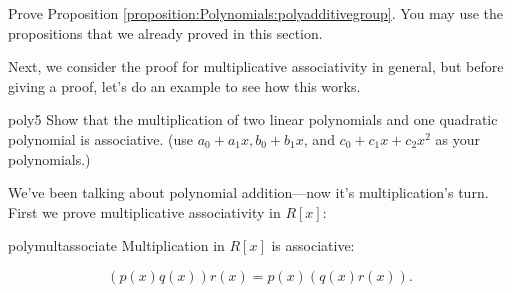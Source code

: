 \begin{exercise}{}
Prove Proposition \ref{proposition:Polynomials:polyadditivegroup}. You may use the propositions that we already proved in this section.
\end{exercise}

Next, we consider the proof for multiplicative associativity in general, but before giving a proof, let's do an example to see how this works.

\begin{exercise}{poly5}
Show that the multiplication of two linear polynomials and one quadratic polynomial is associative. (use $a_0+a_1x, b_0+b_1x$, and $c_0+c_1x+c_2x^2$ as your polynomials.)
\end{exercise}

We've been talking about polynomial addition---now it's multiplication's turn. First we prove multiplicative associativity in $R[x]$:

\begin{prop}{polymultassociate} Multiplication in $R[x]$ is associative: 
	
	\[(p(x) q(x)) r(x)  = p(x) (q(x) r(x)).\]	
\end {prop}


